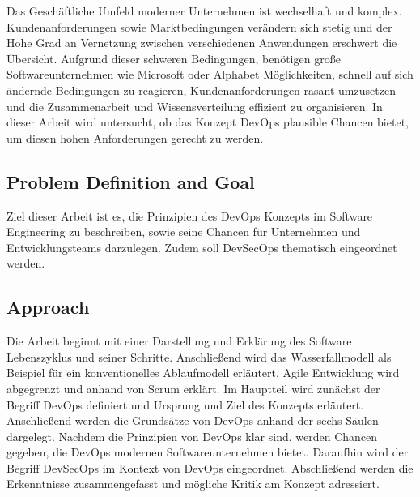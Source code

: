 Das Geschäftliche Umfeld moderner Unternehmen ist wechselhaft und komplex.
Kundenanforderungen sowie Marktbedingungen verändern sich stetig und der Hohe Grad an
Vernetzung zwischen verschiedenen Anwendungen erschwert die Übersicht.
Aufgrund dieser schweren Bedingungen, benötigen große Softwareunternehmen wie
Microsoft oder Alphabet Möglichkeiten, schnell auf sich ändernde Bedingungen zu reagieren,
Kundenanforderungen rasant umzusetzen und die Zusammenarbeit und Wissensverteilung effizient
zu organisieren. In dieser Arbeit wird untersucht, ob das Konzept DevOps plausible
Chancen bietet, um diesen hohen Anforderungen gerecht zu werden.

\subsection{Problem Definition and Goal}

Ziel dieser Arbeit ist es, die Prinzipien des DevOps Konzepts im Software Engineering
zu beschreiben, sowie seine Chancen für Unternehmen und Entwicklungsteams darzulegen.
Zudem soll DevSecOps thematisch eingeordnet werden. 

\subsection{Approach}

Die Arbeit beginnt mit einer Darstellung und Erklärung des Software Lebenszyklus und seiner
Schritte. Anschließend wird das Wasserfallmodell als Beispiel für ein konventionelles Ablaufmodell
erläutert. Agile Entwicklung wird abgegrenzt und anhand von Scrum erklärt.
Im Hauptteil wird zunächst der Begriff DevOps definiert und Ursprung und Ziel des Konzepts
erläutert. Anschließend werden die Grundsätze von DevOps anhand der sechs Säulen dargelegt.
Nachdem die Prinzipien von DevOps klar sind, werden Chancen gegeben, die DevOps modernen
Softwareunternehmen bietet. Daraufhin wird der Begriff DevSecOps im Kontext von DevOps eingeordnet.
Abschließend werden die Erkenntnisse zusammengefasst und mögliche Kritik am Konzept adressiert.